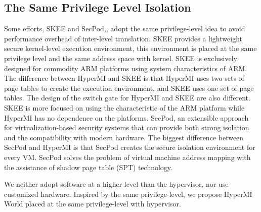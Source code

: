 \documentclass[conference]{IEEEtran}
\begin{document}
\subsection{The Same Privilege Level Isolation}
Some efforts, 
 SKEE\cite{Azab2016SKEE} and SecPod\cite{Wang2015SecPod},\cite{Deng2017Dancing}, adopt the same privilege-level idea to avoid performance overhead of inter-level translation.
 SKEE provides a lightweight secure kernel-level execution environment, this environment is placed at the same privilege level and the same address space with kernel. SKEE is exclusively designed for commodity ARM platforms using system characteristics of ARM. The difference between HyperMI and SKEE is that HyperMI uses two sets of page tables to create the execution environment, and SKEE uses one set of page tables. The design of the switch gate for HyperMI and SKEE are also different. SKEE is more focused on using the characteristic of the ARM platform while HyperMI has no dependence on the platforms.
SecPod, an extensible approach for virtualization-based security systems that can provide both strong isolation and the compatibility with modern hardware. The biggest difference between SecPod and HyperMI is that SecPod creates the secure isolation environment for every VM. SecPod solves the problem of virtual machine address mapping with the assistance of shadow page table (SPT) technology.

We neither adopt software at a higher level than the hypervisor, nor use customized hardware. Inspired by the same privilege-level, we propose HyperMI World placed at the same privilege-level with hypervisor.
\end{document}
